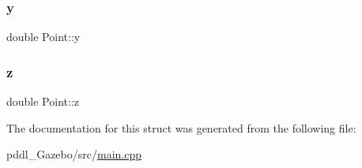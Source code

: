 \subsubsection{\texorpdfstring{y}{y}}
{\footnotesize\ttfamily double Point\+::y}

\mbox{\label{structPoint_a05ba3b1dfcb19430582ae953cbbfbded}} 
\subsubsection{\texorpdfstring{z}{z}}
{\footnotesize\ttfamily double Point\+::z}



The documentation for this struct was generated from the following file\+:\begin{DoxyCompactItemize}
\item 
pddl\+\_\+\+Gazebo/src/\hyperlink{pddl__Gazebo_2src_2main_8cpp}{main.\+cpp}\end{DoxyCompactItemize}

